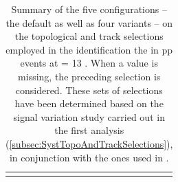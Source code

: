 \begin{table}[h]
\begin{tabular}{c|c|c|c|c|c}
    \noalign{\smallskip}\hline \noalign{\smallskip}
    \end{tabular}
    \caption{Summary of the five configurations -- the default as well as four variants -- on the topological and track selections employed in the identification the \rmXiPM in pp events at \sqrtS = 13 \tev. When a value is missing, the preceding selection is considered. These sets of selections have been determined based on the signal variation study carried out in the first analysis (\Sec\ref{subsec:SystTopoAndTrackSelections}), in conjunction with the ones used in \cite{alicecollaborationMultiplicityDependenceMulti2020}.}\label{tab:SystTopoCorrelatedAnalysisXi}
\end{table}

%    
%    
